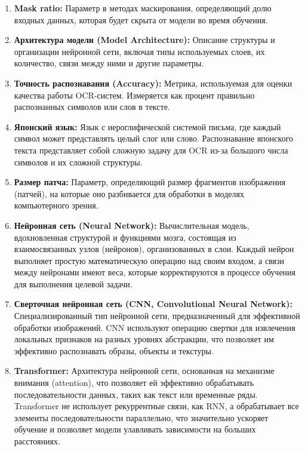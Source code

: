 \begin{enumerate}
    \item \textbf{Mask ratio:}  Параметр  в  методах  маскирования,  определяющий  долю  входных  данных,  которая  будет  скрыта  от  модели  во  время  обучения.  

    \item \textbf{Архитектура модели (Model Architecture):} Описание структуры и организации нейронной сети, включая типы используемых слоев, их количество, связи между ними и другие параметры.

    \item \textbf{Точность распознавания (Accuracy):}  Метрика,  используемая  для  оценки  качества  работы  OCR-систем.  Измеряется  как  процент  правильно  распознанных  символов  или  слов  в  тексте.

    \item \textbf{Японский язык:} Язык с  иероглифической  системой письма,  где  каждый символ может представлять целый слог  или  слово.   Распознавание японского текста представляет собой сложную задачу для OCR  из-за  большого  числа  символов и  их  сложной  структуры.

    \item \textbf{Размер патча:} Параметр, определяющий размер фрагментов изображения (патчей), на которые оно разбивается для обработки в моделях компьютерного зрения.

    \item \textbf{Нейронная сеть (Neural Network):} Вычислительная модель, вдохновленная структурой и функциями мозга, состоящая из взаимосвязанных узлов (нейронов), организованных в слои. Каждый нейрон выполняет простую математическую операцию над своим входом, а связи между нейронами имеют веса, которые корректируются в процессе обучения для выполнения целевой задачи.

    \item \textbf{Сверточная нейронная сеть (CNN, Convolutional Neural Network):} Специализированный тип нейронной сети, предназначенный для эффективной обработки изображений. CNN используют операцию свертки для извлечения локальных признаков на разных уровнях абстракции, что позволяет им эффективно распознавать образы, объекты и текстуры.
    
    \item \textbf{Transformer:} Архитектура нейронной сети, основанная на механизме внимания (attention), что позволяет ей эффективно обрабатывать последовательности данных, таких как текст или временные ряды. Transformer не использует рекуррентные связи, как RNN, а обрабатывает все элементы последовательности параллельно, что значительно ускоряет обучение и позволяет модели улавливать зависимости на больших расстояниях. 


\end{enumerate}
